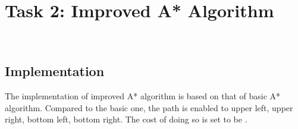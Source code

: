 \documentclass[aps,letterpaper,10pt]{revtex4}
\begin{document}
\vspace{5mm}
	
	\vspace{3mm}



\newpage
\section{Task 2: Improved A* Algorithm}
\begin{figure}[H]
	  \centering
	  \\
	  \caption{}
	  \label{fig:oscil}
	\end{figure}

\subsection{Implementation}
The implementation of improved A* algorithm is based on that of basic A* algorithm. Compared to the basic one, the path is enabled to upper left, upper right, bottom left, bottom right. The cost of doing so is set to be  .

\vspace{5mm}
	
	\vspace{3mm}
\end{document}
